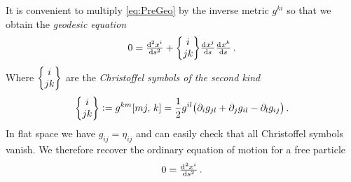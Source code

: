 It is convenient to multiply \eqref{eq:PreGeo} by the inverse metric $g^{ki}$ so that we obtain the \emph{geodesic equation}
\begin{equation}
    0 = \od[2]{x^i}{s}+\cSym{i}{j}{k}\od{x^j}{s}\od{x^k}{s}\, .\label{eq:geodeq}
\end{equation}
Where $\begin{Bmatrix} i \\ j k \end{Bmatrix}$ are the \emph{Christoffel symbols of the second kind}
\begin{equation}
    \cSym{i}{j}{k}:=g^{km}\csym{m}{j}{k}=\frac{1}{2}g^{il}\left(\partial_i
    g_{jl} + \partial_j g_{il} - \partial_l g_{ij}\right)\, .
\end{equation}
In flat space we have $g_{ij}=\eta_{ij}$ and can easily check that all
Christoffel symbols vanish. We therefore recover the ordinary equation of motion for a free particle
\begin{equation}
    0 = \od[2]{x^i}{s}\, .
\end{equation}
